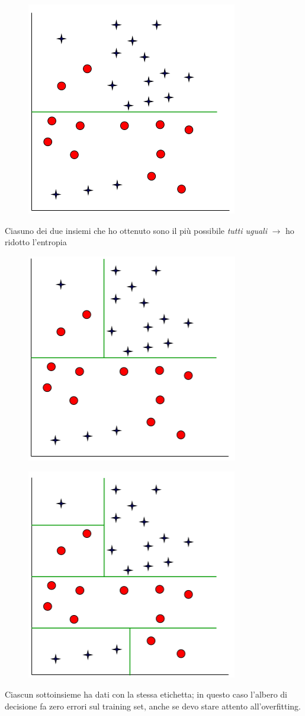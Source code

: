 \documentclass{report}
\begin{document}
\begin{figure}[H]
    \centering
    \includegraphics[width=0.4\linewidth]{images/split1.png}
\end{figure}

\noindent Ciasuno dei due insiemi che ho ottenuto sono il più possibile \textit{tutti uguali} $\rightarrow$ ho ridotto l'entropia 

\begin{figure}[H]
    \centering
    \includegraphics[width=0.4\linewidth]{images/split2.png}
\end{figure}

\begin{figure}[H]
    \centering
    \includegraphics[width=0.4\linewidth]{images/split3.png}
\end{figure}

\noindent Ciascun sottoinsieme ha dati con la stessa etichetta; in questo caso l'albero di decisione fa zero errori sul training set, anche se 
devo stare attento all'overfitting.
\end{document}
